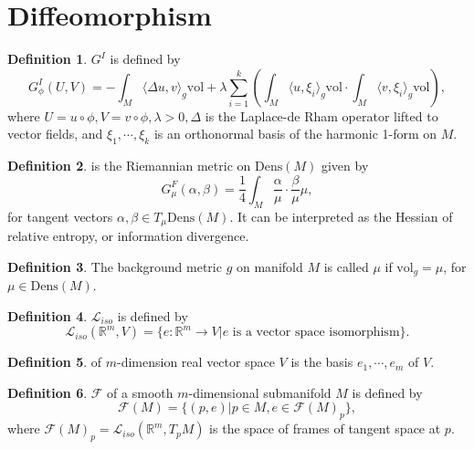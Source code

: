 \documentclass[a4paper]{article}
\theoremstyle{definition}
\newtheorem{definition}{Definition}
\theoremstyle{plain}
\begin{document}
\newpage
\section{Diffeomorphism}
\begin{definition}
 $G^I$ is defined by
\begin{equation*}
    G^I_\phi(U,V)=-\int_M\langle\Delta u,v\rangle_g \mathrm{vol}+\lambda\sum^k_{i=1}\left(\int_M\langle u,\xi_i\rangle_g \mathrm{vol}\cdot\int_M\langle v,\xi_i\rangle_g \mathrm{vol}\right),
\end{equation*}
where $U=u\circ\phi, V=v\circ\phi, \lambda>0, \Delta$ is the Laplace-de Rham operator lifted to vector fields, and $\xi_1,\cdots,\xi_k$ is an orthonormal basis of the harmonic 1-form on $M$.
\end{definition}

\begin{definition}
 is the Riemannian metric on $\mathrm{Dens}(M)$ given by
\begin{equation*}
    G^F_\mu(\alpha,\beta)=\frac{1}{4}\int_M\frac{\alpha}{\mu}\cdot\frac{\beta}{\mu}\mu,
\end{equation*}
for tangent vectors $\alpha,\beta\in T_\mu\mathrm{Dens}(M)$. It can be interpreted as the Hessian of relative entropy, or information divergence.
\end{definition}

\begin{definition}
The background metric $g$ on manifold $M$ is called  $\mu$ if $\mathrm{vol}_g=\mu$, for $\mu\in\mathrm{Dens}(M)$.
\end{definition}

\begin{definition}
 $\mathcal{L}_{iso}$ is defined by
\begin{equation*}
    \mathcal{L}_{iso}(\mathbb{R}^m,V)=\{e:\mathbb{R}^m\rightarrow V|e \text{ is a vector space isomorphism}\}.
\end{equation*}
\end{definition}

\begin{definition}
 of $m$-dimension real vector space $V$ is the basis $e_1,\cdots,e_m$ of $V$.
\end{definition}

\begin{definition}
 $\mathcal{F}$ of a smooth $m$-dimensional submanifold $M$ is defined by
\begin{equation*}
    \mathcal{F}(M)=\{(p,e)|p\in M,e\in\mathcal{F}(M)_p\},
\end{equation*}
where $\mathcal{F}(M)_p=\mathcal{L}_{iso}(\mathbb{R}^m,T_pM)$ is the space of frames of tangent space at $p$.
\end{definition}
\end{document}
